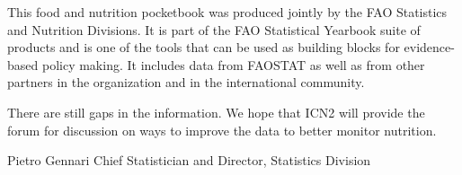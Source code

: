 This food and nutrition pocketbook was produced jointly by the FAO Statistics and Nutrition Divisions. It is part of the FAO Statistical Yearbook suite of products and is one of the tools that can be used as building blocks for evidence-based policy making. It includes data from FAOSTAT as well as from other partners in the organization and in the international community. 

There are still gaps in the information. We hope that ICN2 will  provide the  forum for discussion on ways to improve the data to better monitor nutrition.

\bigskip

{\centering
Pietro Gennari
Chief Statistician and Director, Statistics Division
}

